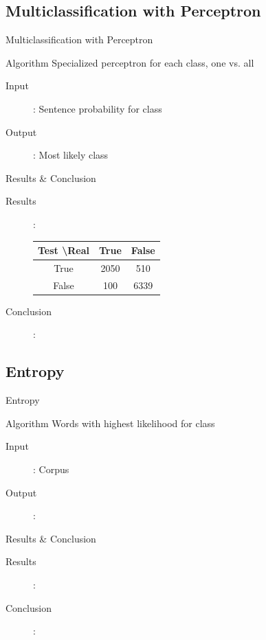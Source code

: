 \documentclass{beamer}
\begin{document}
\subsection{Multiclassification with Perceptron}
\begin{frame}{Multiclassification with Perceptron}
\begin{block}{Algorithm}
Specialized perceptron for each class, one vs. all
\end{block}
\begin{description}
\item[Input]: Sentence probability for class
\item[Output]: Most likely class
\end{description}
\end{frame}
\begin{frame}{Results \& Conclusion}
\begin{description}
\item[Results]: 
\begin{tabular}{c || c | c}\\
Test \textbackslash Real & True & False \\
\hline
True & 2050 & 510 \\
False & 100 & 6339 \\
\end{tabular}
\item[Conclusion]:
\end{description}
\end{frame}

\subsection{Entropy}
\begin{frame}{Entropy}
\begin{block}{Algorithm}
Words with highest likelihood for class
\end{block}
\begin{description}
\item[Input]: Corpus
\item[Output]:
\end{description}
\end{frame}
\begin{frame}{Results \& Conclusion}
\begin{description}
\item[Results]: 
\item[Conclusion]:
\end{description}
\end{frame}
\end{document}
